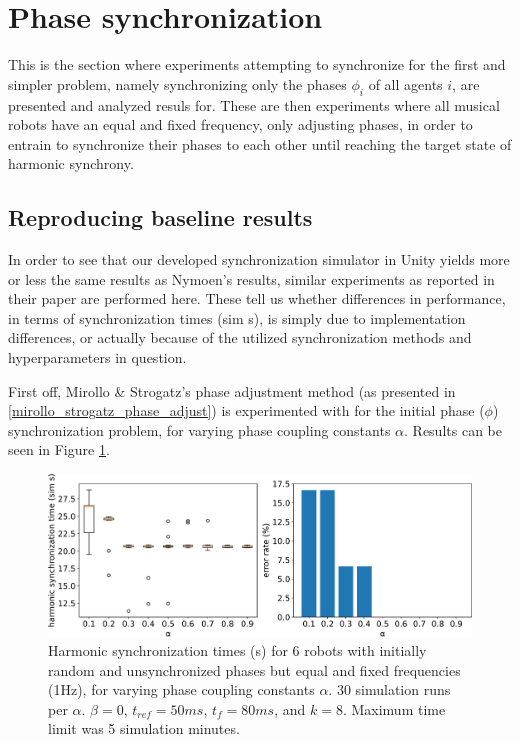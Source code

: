 \section{Phase synchronization}
This is the section where experiments attempting to synchronize for the first and simpler problem, namely synchronizing only the phases $\phi_i$ of all agents $i$, are presented and analyzed resuls for. These are then experiments where all musical robots have an equal and fixed frequency, only adjusting phases, in order to entrain to synchronize their phases to each other until reaching the target state of harmonic synchrony.
	
	\subsection{Reproducing baseline results}
	
	In order to see that our developed synchronization simulator in Unity yields more or less the same results as Nymoen's results, similar experiments as reported in their paper are performed here. These tell us whether differences in performance, in terms of synchronization times (sim s), is simply due to implementation differences, or actually because of the utilized synchronization methods and hyperparameters in question. 
	
	First off, Mirollo \& Strogatz's phase adjustment method (as presented in \ref{mirollo_strogatz_phase_adjust}) is experimented with for the initial phase ($\phi$) synchronization problem, for varying phase coupling constants $\alpha$. Results can be seen in Figure \ref{fig:exp1}.
	
	\begin{figure}[ht!]
		\centering
		\includegraphics[width=\linewidth]{Assets/DocSegments/Chapters/ExperimentsAndResults/Figures/PerfScores/experiment1_rerun_perfScores.pdf}
		\caption{Harmonic synchronization times (s) for 6 robots with initially random and unsynchronized phases but equal and fixed frequencies (1Hz), for varying phase coupling constants $\alpha$. 30 simulation runs per $\alpha$. $\beta=0$, $t_{ref}=50ms$, $t_f=80ms$, and $k=8$. Maximum time limit was 5 simulation minutes.}
		\label{fig:exp1}
	\end{figure}
	
